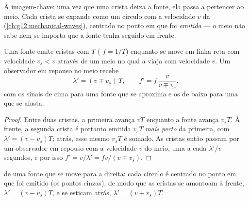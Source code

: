 A imagem-chave: uma vez que uma crista deixa a fonte, ela passa a
pertencer ao meio. Cada crista se expande como um círculo com a
velocidade $v$ da  (\cref{ch:g12:mechanical-waves}), centrado no
ponto em que foi \emph{emitida} --- o meio não sabe nem se importa que a
fonte tenha seguido em frente.

\begin{proposition}\label{prop:g12:doppler-effect:moving-source}
Uma fonte emite cristas com  $T$ ( $f = 1/T$) enquanto
se move em linha reta com velocidade $v_s < v$ através de um meio no qual
a  viaja com velocidade $v$. Um observador em repouso no meio recebe
\[
\lambda' = (v \mp v_s)\,T, \qquad f' = f\,\frac{v}{v \mp v_s},
\]
com os sinais de cima para uma fonte que se aproxima e os de baixo para
uma que se afasta.
\end{proposition}

\begin{proof}
Entre duas cristas, a primeira avança $vT$ enquanto a fonte avança
$v_s T$. À frente, a segunda crista é portanto emitida $v_s T$
\emph{mais perto} da primeira, com $\lambda' = (v - v_s)T$; atrás, esse
mesmo $v_s T$ é somado. As cristas então passam por um observador em
repouso com a velocidade $v$ do meio, uma a cada $\lambda'/v$ segundos, e
por isso $f' = v/\lambda' = f v/(v \mp v_s)$.
\end{proof}

\begin{omfigure}

{\small {} de uma fonte que se move para a direita: cada
círculo é centrado no ponto em que foi emitido (os pontos cinzas), de
modo que as cristas se amontoam à frente,
$\lambda' = (v - v_s)T$, e se esticam atrás, $\lambda' = (v + v_s)T$.}
\end{omfigure}

